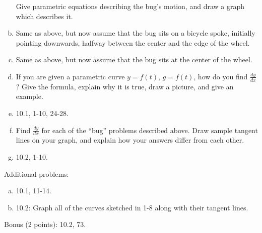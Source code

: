\documentclass[12pt]{article}
\begin{document}
\begin{enumerate}[(a)]
Give parametric equations describing the bug's motion, and draw a graph which describes it.

\item
Same as above, but now assume that the bug sits on a bicycle spoke, initially pointing
downwards, halfway between the center and the edge of the wheel.

\item
Same as above, but now assume that the bug sits at the center of the wheel.

\item
If you are given a parametric curve $y = f(t)$, $g = f(t)$, how do you find $\frac{dy}{dx}$?
Give the formula, explain why it is true, draw a picture, and give an example.

\item
10.1, 1-10, 24-28.

\item
Find $\frac{dy}{dx}$ for each of the ``bug'' problems described above. Draw sample tangent lines
on your graph, and explain how your answers differ from each other. 
\item
10.2, 1-10.
\end{enumerate}
Additional problems: 
\begin{enumerate}[(a)]
\item
10.1, 11-14.
\item
10.2: Graph all of the curves sketched in 1-8 along with their tangent lines.
\end{enumerate}
Bonus (2 points): 10.2, 73.
\end{document}
